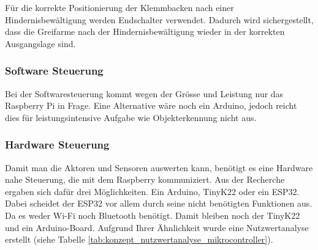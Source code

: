\documentclass[../main.tex]{subfiles}
\begin{document}
 Für die korrekte Positionierung der Klemmbacken nach einer Hindernisbewältigung werden Endschalter verwendet. Dadurch wird sichergestellt, dass die Greifarme nach der Hindernisbewältigung wieder in der korrekten Ausgangslage sind.

\subsubsection{Software Steuerung}

Bei der Softwaresteuerung kommt wegen der Grösse und Leistung nur das Raspberry Pi in Frage.
Eine Alternative wäre noch ein Arduino, jedoch reicht dies für leistungsintensive Aufgabe wie
Objekterkennung nicht aus.

\subsubsection{Hardware Steuerung}
Damit man die Aktoren und Sensoren auswerten kann, benötigt es eine Hardware nahe Steuerung, die mit dem Raspberry kommuniziert. Aus der Recherche ergaben sich dafür drei Möglichkeiten. Ein Arduino, TinyK22 oder ein ESP32. Dabei scheidet der ESP32 vor allem durch seine nicht benötigten Funktionen aus. Da es weder Wi-Fi noch Bluetooth benötigt. Damit bleiben noch der TinyK22 und ein Arduino-Board. Aufgrund Ihrer Ähnlichkeit wurde eine Nutzwertanalyse erstellt (siehe Tabelle \ref{tab:konzept_nutzwertanalyse_mikrocontroller}).
\end{document}
